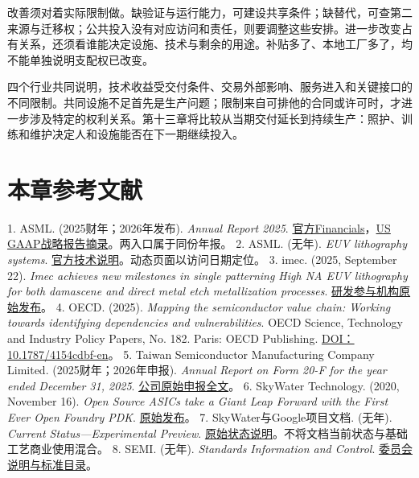 \documentclass[UTF8,fontset=windows,12pt,a4paper,oneside,openany]{ctexbook}
\begin{document}
改善须对着实际限制做。缺验证与运行能力，可建设共享条件；缺替代，可查第二来源与迁移权；公共投入没有对应访问和责任，则要调整这些安排。进一步改变占有关系，还须看谁能决定设施、技术与剩余的用途。补贴多了、本地工厂多了，均不能单独说明支配权已改变。

四个行业共同说明，技术收益受交付条件、交易外部影响、服务进入和关键接口的不同限制。共同设施不足首先是生产问题；限制来自可排他的合同或许可时，才进一步涉及特定的权利关系。第十三章将比较从当期交付延长到持续生产：照护、训练和维护决定人和设施能否在下一期继续投入。

\section*{本章参考文献}

1. ASML. (2025财年；2026年发布). \emph{Annual Report 2025}. \href{https://www.asml.com/investors/annual-report/2025/financials}{官方Financials}，\href{https://ourbrand.asml.com/m/8ab959d4926657b/original/asml-2025-annual-report-strategic-report-section.pdf}{US GAAP战略报告摘录}。两入口属于同份年报。
2. ASML. (无年). \emph{EUV lithography systems}. \href{https://www.asml.com/en/products/euv-lithography-systems}{官方技术说明}。动态页面以访问日期定位。
3. imec. (2025, September 22). \emph{Imec achieves new milestones in single patterning High NA EUV lithography for both damascene and direct metal etch metallization processes}. \href{https://www.imec-int.com/en/press/imec-achieves-new-milestones-single-patterning-high-na-euv-lithography-both-damascene-and}{研发参与机构原始发布}。
4. OECD. (2025). \emph{Mapping the semiconductor value chain: Working towards identifying dependencies and vulnerabilities}. OECD Science, Technology and Industry Policy Papers, No. 182. Paris: OECD Publishing. \href{https://doi.org/10.1787/4154cdbf-en}{DOI：10.1787/4154cdbf-en}。
5. Taiwan Semiconductor Manufacturing Company Limited. (2025财年；2026年申报). \emph{Annual Report on Form 20-F for the year ended December 31, 2025}. \href{https://investor.tsmc.com/sites/ir/sec-filings/2025_20F\%20Report.pdf}{公司原始申报全文}。
6. SkyWater Technology. (2020, November 16). \emph{Open Source ASICs take a Giant Leap Forward with the First Ever Open Foundry PDK}. \href{https://www.skywatertechnology.com/open-source-asics-take-a-giant-leap-forward-with-first-ever-open-foundry-pdk/}{原始发布}。
7. SkyWater与Google项目文档. (无年). \emph{Current Status—Experimental Preview}. \href{https://skywater-pdk.readthedocs.io/en/main/status.html}{原始状态说明}。不将文档当前状态与基础工艺商业使用混合。
8. SEMI. (无年). \emph{Standards Information and Control}. \href{https://www.semi.org/en/products-services/standards/information_and_control}{委员会说明与标准目录}。
\end{document}
